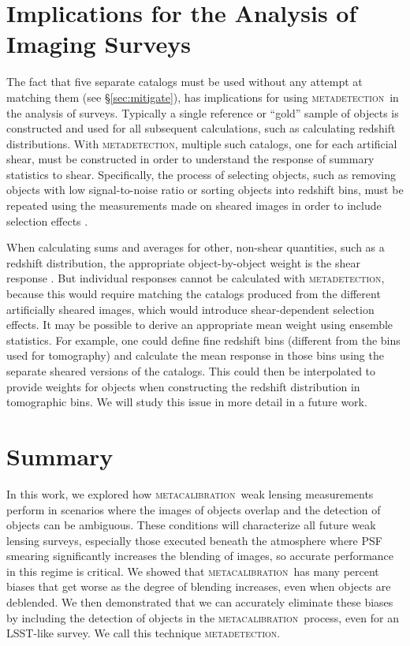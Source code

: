 \documentclass[iop, twocolappendix, appendixfloats, numberedappendix, apj]{hackemulateapj}
\newcommand{\mcal}{\textsc{metacalibration}}
\newcommand{\mdet}{\textsc{metadetection}}
\begin{document}
\section{Implications for the Analysis of Imaging Surveys} \label{sec:wavg}

The fact that five separate catalogs must be used without any attempt at
matching them (see \S \ref{sec:mitigate}), has implications for using \mdet\ in
the analysis of surveys.  Typically a single reference or ``gold'' sample of
objects is constructed and used for all subsequent calculations, such as
calculating redshift distributions.  With \mdet, multiple such catalogs, one
for each artificial shear, must be constructed in order to understand the
response of summary statistics to shear.  Specifically, the process of
selecting objects, such as removing objects with low signal-to-noise ratio or
sorting objects into redshift bins, must be repeated using the measurements made on
sheared images in order to include selection effects \citep{SheldonMcal2017}.

When calculating sums and averages for other, non-shear quantities, such as a
redshift distribution, the appropriate object-by-object weight is the shear
response \citep{SheldonMcal2017}.  But individual responses cannot be
calculated with \mdet, because this would require matching the catalogs
produced from the different artificially sheared images, which would introduce
shear-dependent selection effects.  It may be possible to derive an appropriate
mean weight using ensemble statistics.  For example, one could define fine
redshift bins (different from the bins used for tomography) and calculate the
mean response in those bins using the separate sheared versions of the
catalogs. This could then be interpolated to provide weights for objects when
constructing the redshift distribution in tomographic bins.  We will study this
issue in more detail in a future work.


\section{Summary}\label{sec:conc}

In this work, we explored how \mcal\ weak lensing measurements perform in
scenarios where the images of objects overlap and the detection of objects can
be ambiguous. These conditions will characterize all future weak lensing
surveys, especially those executed beneath the atmosphere where PSF smearing
significantly increases the blending of images, so accurate performance in this
regime is critical. We showed that \mcal\ has many percent biases that get worse
as the degree of blending increases, even when objects are deblended.  We then
demonstrated that we can accurately eliminate these biases by including
the detection of objects in the \mcal\ process, even for an LSST-like survey.
We call this technique \mdet.
\end{document}

